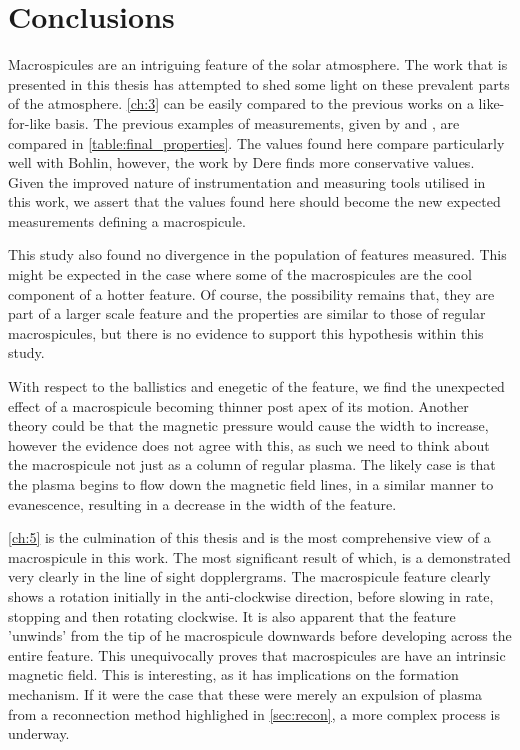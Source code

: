 
\label{ch:conc}
\chapter{Conclusions}

Macrospicules are an intriguing feature of the solar atmosphere.
The work that is presented in this thesis has attempted to shed some light on these prevalent parts of the atmosphere.
\cref{ch:3} can be easily compared to the previous works on a like-for-like basis.
The previous examples of measurements, given by \cite{Bohlin1975} and \cite{Dere89}, are compared in \cref{table:final_properties}.
The values found here compare particularly well with Bohlin, however, the work by Dere finds more conservative values.
Given the improved nature of instrumentation and measuring tools utilised in this work, we assert that the values found here should become the new expected measurements defining a macrospicule.

This study also found no divergence in the population of features measured.
This might be expected in the case where some of the macrospicules are the cool component of a hotter feature.
Of course, the possibility remains that, they are part of a larger scale feature and the properties are similar to those of regular macrospicules, but there is no evidence to support this hypothesis within this study.   

With respect to the ballistics and enegetic of the feature, we find the unexpected effect of a macrospicule becoming thinner post apex of its motion.
Another theory could be that the magnetic pressure would cause the width to increase, however the evidence does not agree with this, as such we need to think about the macrospicule not just as a column of regular plasma.
The likely case is that the plasma begins to flow down the magnetic field lines, in a similar manner to evanescence, resulting in a decrease in the width of the feature.

\cref{ch:5} is the culmination of this thesis and is the most comprehensive view of a macrospicule in this work.
The most significant result of which, is a demonstrated very clearly in the line of sight dopplergrams.
The macrospicule feature clearly shows a rotation initially in the anti-clockwise direction, before slowing in rate, stopping and then rotating clockwise.
It is also apparent that the feature 'unwinds' from the tip of he macrospicule downwards before developing across the entire feature.  
This unequivocally proves that macrospicules are have an intrinsic magnetic field.
This is interesting, as it has implications on the formation mechanism.
If it were the case that these were merely an expulsion of plasma from a reconnection method highlighed in \cref{sec:recon}, a more complex process is underway.


